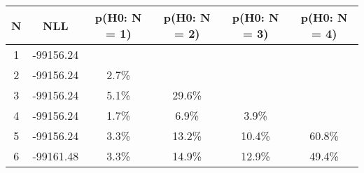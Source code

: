 \begin{table}[h!]
	\centering
	\begin{tabular}{cc||cccc}
		N & NLL & p(H0: N = 1) & p(H0: N = 2) & p(H0: N = 3) & p(H0: N = 4)\\ 
		\hline
1 & -99156.24 & & & & \\
2 & -99156.24 & 2.7\% & & & \\
3 & -99156.24 & 5.1\% & 29.6\% & & \\
4 & -99156.24 & 1.7\% & 6.9\% & 3.9\% & \\
5 & -99156.24 & 3.3\% & 13.2\% & 10.4\% & 60.8\% \\
6 & -99161.48 & 3.3\% & 14.9\% & 12.9\% & 49.4\% \\
	\end{tabular}
	\label{tab:lab}
\end{table}

